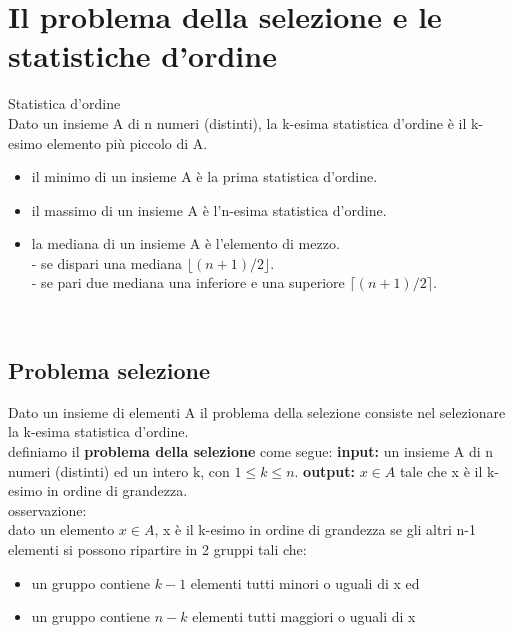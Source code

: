 \chapter{Il problema della selezione e le statistiche d'ordine}
\colorbox{SALZO}{\parbox{\dimexpr\linewidth-2\fboxsep}{\begin{definition}
    Statistica d'ordine\\
    Dato un insieme A di n numeri (distinti), la k-esima statistica d'ordine è il k-esimo elemento più piccolo di A.\\
    \begin{itemize} 
        \item il minimo di un insieme A è la prima statistica d'ordine.
        \item il massimo di un insieme A è l'n-esima statistica d'ordine.
        \item la mediana di un insieme A è l'elemento di mezzo.\\
        - se dispari una mediana $\lfloor (n+1)/2 \rfloor$.\\
        - se pari due mediana una inferiore e una superiore $\lceil (n+1)/2 \rceil$.
\end{itemize}
    
\end{definition}}}\medskip\\ 

\section{Problema selezione}
Dato un insieme di elementi A il problema della selezione consiste nel selezionare la k-esima statistica d'ordine.\\
definiamo il \textbf{problema della selezione} come segue:
\textbf{input: }un insieme A di n numeri (distinti) ed un intero k, con $ 1 \le k \le n $.
\textbf{output: } $x \in A$ tale che x è il k-esimo in ordine di grandezza.\\
osservazione:\\
dato un elemento $x \in A$, x è il k-esimo in ordine di grandezza se gli altri n-1 elementi si possono ripartire in 2 gruppi tali che:
\begin{itemize}
    \item un gruppo contiene $k-1$ elementi tutti minori o uguali di x ed
    \item un gruppo contiene $n-k$ elementi tutti maggiori o uguali di x
\end{itemize}


